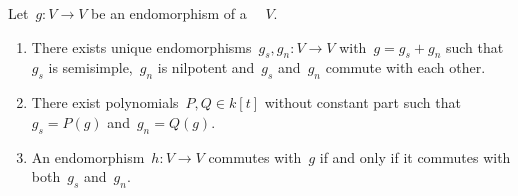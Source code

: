 \begin{proposition}
  \label{jcd}
  Let~$g \colon V \to V$ be an endomorphism of a ~~$V$.
  \begin{enumerate}
    \item
      \label{the jcd itself}
      There exists unique endomorphisms~$g_s, g_n \colon V \to V$ with~$g = g_s + g_n$ such that~$g_s$ is semisimple,~$g_n$ is nilpotent and~$g_s$ and~$g_n$ commute with each other.
    \item
      \label{existence of polynomials}
      There exist polynomials~$P, Q \in k[t]$ without constant part such that~$g_s = P(g)$ and~$g_n = Q(g)$.
    \item
      \label{commuting via jcd}
      An endomorphism~$h \colon V \to V$ commutes with~$g$ if and only if it commutes with both~$g_s$ and~$g_n$.
  \end{enumerate}
\end{proposition}


